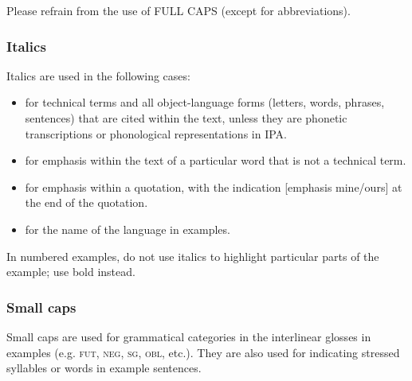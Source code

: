 \documentclass[charis,linguex]{glossa}
\begin{document}

Please refrain from the use of FULL CAPS (except for abbreviations).

\subsubsection{Italics}
Italics are used in the following cases:
\sloppy
\begin{itemize}
\item for technical terms and all object-language forms (letters, words, phrases, sentences) that are cited within the text, unless they are phonetic transcriptions or phonological representations in IPA.
\item for emphasis within the text of a particular word that is not a technical term.
\item for emphasis within a quotation, with the indication [emphasis mine/ours] at the end of the quotation.
\item for the name of the language in examples.
\end{itemize}

In numbered examples, do not use italics to highlight particular parts of the example; use bold instead.

\fussy

\subsubsection{Small caps} 

Small caps are used for grammatical categories in the interlinear glosses in examples (e.g. \textsc{fut, neg, sg, obl}, etc.). They are also used for indicating stressed syllables or words in example sentences. 
\end{document}
